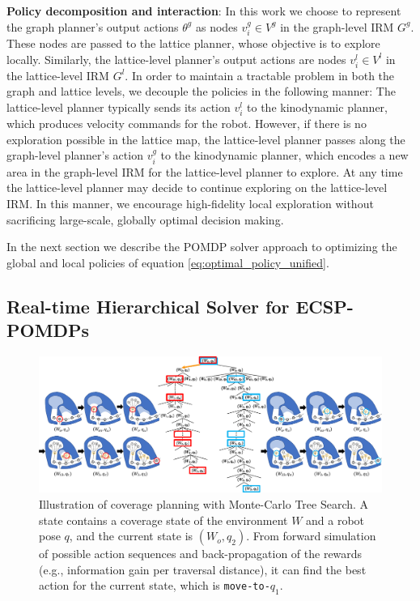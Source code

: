 \documentclass{article}
\newcommand{\ph}[1]{{\textbf{#1}:}} %
\begin{document}
\ph{Policy decomposition and interaction} In this work we choose to represent the graph planner's output actions $\theta^g$ as nodes $v^g_i \in V^g$ in the graph-level IRM $G^g$. These nodes are passed to the lattice planner, whose objective is to explore locally. Similarly, the lattice-level planner's output actions are nodes $v^l_i \in V^l$ in the lattice-level IRM $G^l$.  In order to maintain a tractable problem in both the graph and lattice levels, we decouple the policies in the following manner:  The lattice-level planner typically sends its action $v^l_i$ to the kinodynamic planner, which produces velocity commands for the robot.  However, if there is no exploration possible in the lattice map, the lattice-level planner passes along the graph-level planner's action $v^g_i$ to the kinodynamic planner, which encodes a new area in the graph-level IRM for the lattice-level planner to explore.  At any time the lattice-level planner may decide to continue exploring on the lattice-level IRM.  In this manner, we encourage high-fidelity local exploration without sacrificing large-scale, globally optimal decision making.

In the next section we describe the POMDP solver approach to optimizing the global and local policies of equation \ref{eq:optimal_policy_unified}.


\subsection{Real-time Hierarchical Solver for ECSP-POMDPs}



\begin{figure}[t!]
  \centering
  \includegraphics[width=1.0\textwidth]{figures/belief_tree_search_policy.pdf} %
  \caption{Illustration of coverage planning with Monte-Carlo Tree Search. A state contains a coverage state of the environment $W$ and a robot pose $q$, and the current state is $(W_o, q_2)$. From forward simulation of possible action sequences and back-propagation of the rewards (e.g., information gain per traversal distance), it can find the best action for the current state, which is \texttt{move-to-$q_1$}.}
  \label{fig:belief-tree-search}
\end{figure}
\end{document}
